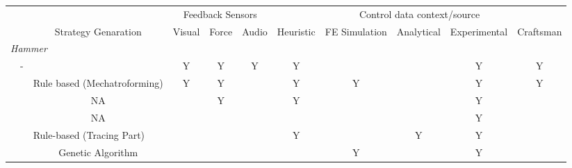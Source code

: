 \begin{tabular}{ccccccccccc} \toprule
               &                                                                                                         & \multicolumn{1}{c}{}             & \multicolumn{3}{c}{Feedback Sensors}    & \multicolumn{5}{c}{Control data   context/source}                 \\
\cmidrule(lr){4-6}\cmidrule(lr){7-11}
               &                                                                                                 & Strategy Genaration              & Visual         & Force      & Audio     & Heuristic & FE Simulation & Analytical & Experimental & Craftsman \\
\midrule
\multicolumn{11}{l}{\textit{Hammer}} \\
         & -                                                                                                       &                                  & Y              & Y          & Y         & Y         &               &            & Y            & Y         \\
               & \citep{Ilangovan2016AnForming}                                                                                  & Rule based (Mechatroforming)     & Y              & Y          &           & Y         & Y             &            & Y            & Y         \\
               & \citep{Russo2020RaisingSpinning}                                                                                & NA                               &                & Y          &           & Y         &               &            & Y            &           \\
               & \citep{Yoon2001InvestigationMetal}                                                                              & NA                               &                &            &           &           &               &            & Y            &           \\
               & \citep{Tanaka2005DevelopmentWorking,Asakawa2010DevelopmentProcess,Takasugi2012DevelopmentShape}                 & \multicolumn{2}{l}{Rule-based (Tracing Part)}     &            &           & Y         &               & Y          & Y            &           \\
               & \citep{Mori1996DeterminationAlgorithm}                                                                          & Genetic Algorithm                &                &            &           &           & Y             &            & Y            &           \\

\end{tabular}
